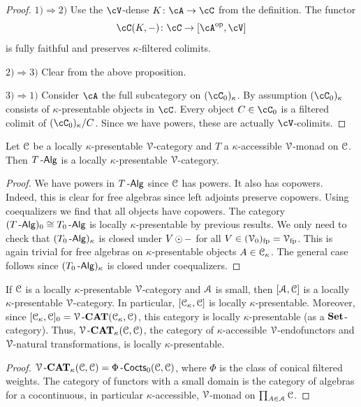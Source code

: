 \documentclass[a4paper,11pt,oneside,openany]{scrbook}
\begin{document}
\begin{proof}
	\item[$ 1)\Rightarrow 2) $]
	Use the $ \cV $-dense $ K \from \cA \to \cC $ from the definition.
	The functor
	\begin{displaymath}
		\cC(K,-)\from \cC \to [\cA^{\op},\cV]
	\end{displaymath}
	is fully faithful and preserves $ \kappa $-filtered colimits.
	\item[$ 2) \Rightarrow 3) $]
	Clear from the above proposition.
	\item[$ 3) \Rightarrow 1) $]
	Consider $ \cA $ the full subcategory on $ (\cC_0)_\kappa $.
	By assumption $ (\cC_0)_\kappa $ consists of $ \kappa $-presentable objects in $ \cC $.
	Every object $ C \in\cC_0 $ is a filtered colimit of $ (\cC_0)_\kappa / C $.
	Since we have powers, these are actually $ \cV $-colimits.
\end{proof}
\begin{cor}
	Let $\operatorname{\mathcal{C}}$ be a locally $\kappa$-presentable $\operatorname{\mathcal{V}}$-category and $T$ a $\kappa$-accessible $\operatorname{\mathcal{V}}$-monad on $\operatorname{\mathcal{C}}$. Then $T\operatorname{-\mathsf{Alg}}$ is a locally $\kappa$-presentable $\operatorname{\mathcal{V}}$-category.
\end{cor}
\begin{proof}
	We have powers in $T\operatorname{-\mathsf{Alg}}$ since $\operatorname{\mathcal{C}}$ has powers. It also has copowers. Indeed, this is clear for free algebras since left adjoints preserve copowers. Using coequalizers we find that all objects have copowers. The category $(T\operatorname{-\mathsf{Alg}})_0\cong T_0\operatorname{-\mathsf{Alg}}$ is locally $\kappa$-presentable by previous results. We only need to check that $(T_0\operatorname{-\mathsf{Alg}})_{\kappa}$ is closed under $V\operatorname{\odot}-$ for all $V\in(\operatorname{\mathcal{V}}_0)_{\text{fp}}=\operatorname{\mathcal{V}}_{\text{fp}}$. This is again trivial for free algebras on $\kappa$-presentable objects $A\in\operatorname{\mathcal{C}}_\kappa$. The general case follows since $(T_0\operatorname{-\mathsf{Alg}})_\kappa$ is closed under coequalizers.
\end{proof}
\begin{cor}
	If $\operatorname{\mathcal{C}}$ is a locally $\kappa$-presentable $\operatorname{\mathcal{V}}$-category and $\operatorname{\mathcal{A}}$ is small, then $[\operatorname{\mathcal{A}},\operatorname{\mathcal{C}}]$ is a locally $\kappa$-presentable $\operatorname{\mathcal{V}}$-category. In particular, $[\operatorname{\mathcal{C}}_\kappa, \operatorname{\mathcal{C}}]$ is locally $\kappa$-presentable. Moreover, since  $[\operatorname{\mathcal{C}}_\kappa, \operatorname{\mathcal{C}}]_0 = \operatorname{\mathcal{V}}\mbox{-}{\normalfont\textbf{CAT}}(\operatorname{\mathcal{C}}_\kappa,\operatorname{\mathcal{C}})$, this category is locally $\kappa$-presentable (as a ${\normalfont\textbf{Set}}$-category). Thus, $\operatorname{\mathcal{V}}\mbox{-}{\normalfont\textbf{CAT}}_\kappa(\operatorname{\mathcal{C}},\operatorname{\mathcal{C}})$, the category of $\kappa$-accessible $\operatorname{\mathcal{V}}$-endofunctors and $\operatorname{\mathcal{V}}$-natural transformations, is locally $\kappa$-presentable.
\end{cor}
\begin{proof}
	$\operatorname{\mathcal{V}}\mbox{-}{\normalfont\textbf{CAT}}_\kappa(\operatorname{\mathcal{C}},\operatorname{\mathcal{C}})=\Phi\operatorname{-\mathsf{Cocts}}_0(\operatorname{\mathcal{C}},\operatorname{\mathcal{C}})$, where $\Phi$ is the class of conical filtered weights. The category of functors with a small domain is the category of algebras for a cocontinuous, in particular $\kappa$-accessible, $\operatorname{\mathcal{V}}$-monad on $\prod_{A\in\operatorname{\mathcal{A}}}\operatorname{\mathcal{C}}$.
\end{proof}
\end{document}

